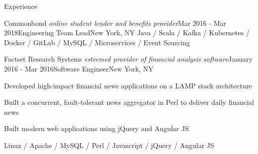 \documentclass{resume} %
\begin{document}
\begin{rSection}{Experience}
\begin{rSubsection}{Commonbond \textit{\scriptsize online student lender and benefits provider}}{Mar 2016 - Mar 2018}{Engineering Team Lead}{New York, NY}
Java / Scala / Kafka / Kubernetes / Docker / GitLab / MySQL / Microservices / Event Sourcing
\end{rSubsection}


\begin{rSubsection}{Factset Research Systems \textit{\scriptsize esteemed provider of financial analysis software}}{January 2016 - Mar 2016}{Software Engineer}{New York, NY}
\item Developed high-impact financial news applications on a LAMP stack architecture
\item Built a concurrent, fault-tolerant news aggregator in Perl to deliver daily financial news
\item Built modern web applications using jQuery and Angular JS
\end{rSubsection}

Linux / Apache / MySQL / Perl / Javascript / jQuery / Angular JS
\end{rSection}





\end{document}
